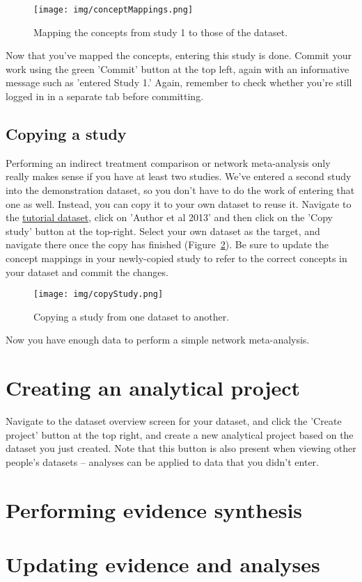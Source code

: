 \documentclass[12pt]{article}
\begin{document}
\begin{figure}[!htbp]
  \centering
  \texttt{[image: img/conceptMappings.png]}
  \caption{Mapping the concepts from study 1 to those of the dataset.}
\label{fig:conceptMappings}
\end{figure}

Now that you've mapped the concepts, entering this study is done. Commit your work using the green 'Commit' button at the top left, again with an informative message such as 'entered Study 1.' Again, remember to check whether you're still logged in in a separate tab before committing.

\subsection{Copying a study}

Performing an indirect treatment comparison or network meta-analysis only really makes sense if you have at least two studies. We've entered a second study into the demonstration dataset, so you don't have to do the work of entering that one as well. Instead, you can copy it to your own dataset to reuse it. Navigate to the \href{https://addis.drugis.org/#/users/12/datasets/c190e953-051c-4cf5-ac10-332984a14a43/versions/7e3468aa-dc7a-456b-ae08-18a1f1492c2e}{tutorial dataset}, click on 'Author et al 2013' and then click on the 'Copy study' button at the top-right. Select your own dataset as the target, and navigate there once the copy has finished (Figure~\ref{fig:copyStudy}). Be sure to update the concept mappings in your newly-copied study to refer to the correct concepts in your dataset and commit the changes.

\begin{figure}[!htbp]
  \centering
  \texttt{[image: img/copyStudy.png]}
  \caption{Copying a study from one dataset to another.}
\label{fig:copyStudy}
\end{figure}

Now you have enough data to perform a simple network meta-analysis.

\section{Creating an analytical project}

Navigate to the dataset overview screen for your dataset, and click the 'Create project' button at the top right, and create a new analytical project based on the dataset you just created. Note that this button is also present when viewing other people's datasets -- analyses can be applied to data that you didn't enter.

\section{Performing evidence synthesis}

\section{Updating evidence and analyses}
\end{document}
